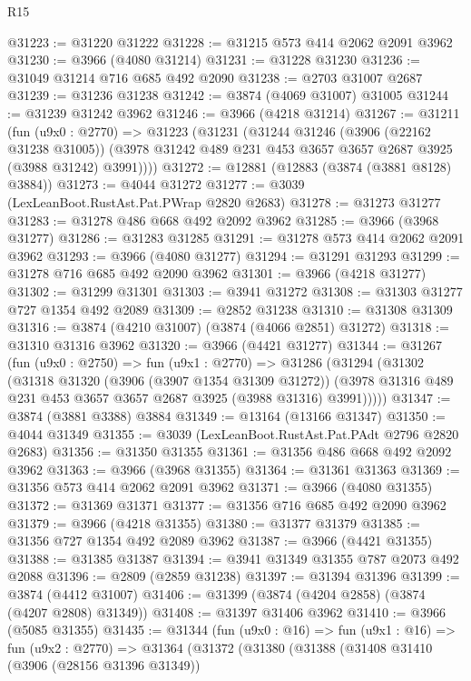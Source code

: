 \begin{lexlean}{R15}
\begin{coremodule}
@31223 := @31220 @31222
@31228 := @31215 @573 @414 @2062 @2091 @3962
@31230 := @3966 (@4080 @31214)
@31231 := @31228 @31230
@31236 := @31049 @31214 @716 @685 @492 @2090
@31238 := @2703 @31007 @2687
@31239 := @31236 @31238
@31242 := @3874 (@4069 @31007) @31005
@31244 := @31239 @31242 @3962
@31246 := @3966 (@4218 @31214)
@31267 := @31211
    (fun (u9x0 : @2770) =>
    @31223
      (@31231
        (@31244
          @31246
          (@3906 (@22162 @31238 @31005))
          (@3978 @31242 @489 @231 @453 @3657 @3657 @2687 @3925 (@3988 @31242) @3991))))
@31272 := @12881 (@12883 (@3874 (@3881 @8128) @3884))
@31273 := @4044 @31272
@31277 := @3039 (LexLeanBoot.RustAst.Pat.PWrap @2820 @2683)
@31278 := @31273 @31277
@31283 := @31278 @486 @668 @492 @2092 @3962
@31285 := @3966 (@3968 @31277)
@31286 := @31283 @31285
@31291 := @31278 @573 @414 @2062 @2091 @3962
@31293 := @3966 (@4080 @31277)
@31294 := @31291 @31293
@31299 := @31278 @716 @685 @492 @2090 @3962
@31301 := @3966 (@4218 @31277)
@31302 := @31299 @31301
@31303 := @3941 @31272
@31308 := @31303 @31277 @727 @1354 @492 @2089
@31309 := @2852 @31238
@31310 := @31308 @31309
@31316 := @3874 (@4210 @31007) (@3874 (@4066 @2851) @31272)
@31318 := @31310 @31316 @3962
@31320 := @3966 (@4421 @31277)
@31344 := @31267
    (fun (u9x0 : @2750) =>
    fun (u9x1 : @2770) =>
    @31286
      (@31294
        (@31302
          (@31318
            @31320
            (@3906 (@3907 @1354 @31309 @31272))
            (@3978 @31316 @489 @231 @453 @3657 @3657 @2687 @3925 (@3988 @31316) @3991)))))
@31347 := @3874 (@3881 @3388) @3884
@31349 := @13164 (@13166 @31347)
@31350 := @4044 @31349
@31355 := @3039 (LexLeanBoot.RustAst.Pat.PAdt @2796 @2820 @2683)
@31356 := @31350 @31355
@31361 := @31356 @486 @668 @492 @2092 @3962
@31363 := @3966 (@3968 @31355)
@31364 := @31361 @31363
@31369 := @31356 @573 @414 @2062 @2091 @3962
@31371 := @3966 (@4080 @31355)
@31372 := @31369 @31371
@31377 := @31356 @716 @685 @492 @2090 @3962
@31379 := @3966 (@4218 @31355)
@31380 := @31377 @31379
@31385 := @31356 @727 @1354 @492 @2089 @3962
@31387 := @3966 (@4421 @31355)
@31388 := @31385 @31387
@31394 := @3941 @31349 @31355 @787 @2073 @492 @2088
@31396 := @2809 (@2859 @31238)
@31397 := @31394 @31396
@31399 := @3874 (@4412 @31007)
@31406 := @31399 (@3874 (@4204 @2858) (@3874 (@4207 @2808) @31349))
@31408 := @31397 @31406 @3962
@31410 := @3966 (@5085 @31355)
@31435 := @31344
    (fun (u9x0 : @16) =>
    fun (u9x1 : @16) =>
    fun (u9x2 : @2770) =>
    @31364
      (@31372
        (@31380
          (@31388
            (@31408
              @31410
              (@3906 (@28156 @31396 @31349))

\end{coremodule}
\end{lexlean}
